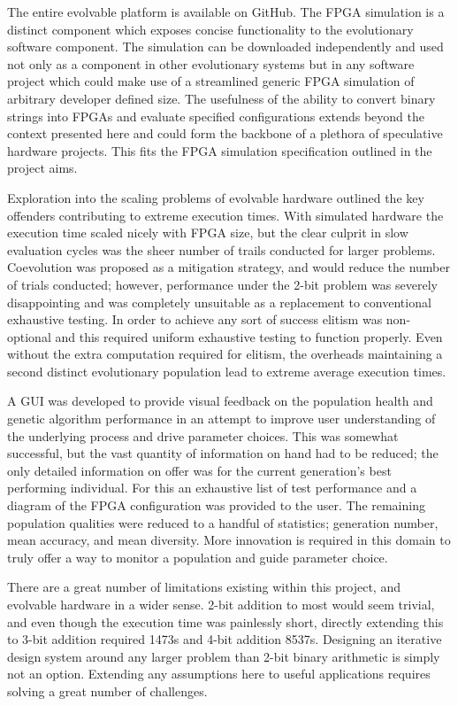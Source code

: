 The entire evolvable platform is available on GitHub. The FPGA simulation
is a distinct component which exposes concise functionality to the evolutionary
software component. The simulation can be downloaded independently and used
not only as a component in other evolutionary systems but in any software project
which could make use of a streamlined generic FPGA simulation of arbitrary developer
defined size. The usefulness of the ability to convert binary strings into FPGAs and evaluate specified
configurations extends beyond the context presented here and could form the backbone
of a plethora of speculative hardware projects. This fits the FPGA simulation
specification outlined in the project aims.

Exploration into the scaling problems of evolvable hardware outlined the key
offenders contributing to extreme execution times. With simulated hardware
the execution time scaled nicely with FPGA size, but the clear culprit in
slow evaluation cycles was the sheer number of trails conducted for larger
problems. Coevolution was proposed as a mitigation strategy, and would reduce
the number of trials conducted; however, performance under the 2-bit problem
was severely disappointing and was completely unsuitable as a replacement to
conventional exhaustive testing. In order to achieve any sort of success
elitism was non-optional and this required uniform exhaustive testing to function
properly. Even without the extra computation required for elitism, the overheads
maintaining a second distinct evolutionary population lead to extreme average
execution times.

A GUI was developed to provide visual feedback on the population health
and genetic algorithm performance in an attempt to improve user understanding
of the underlying process and drive parameter choices. This was somewhat successful,
but the vast quantity of information on hand had to be reduced; the only detailed
information on offer was for the current generation's best performing individual.
For this an exhaustive list of test performance and a diagram of the FPGA configuration
was provided to the user. The remaining population qualities were reduced to a handful
of statistics; generation number, mean accuracy, and mean diversity. More innovation
is required in this domain to truly offer a way to monitor a population and guide
parameter choice.

There are a great number of limitations existing within this project, and
evolvable hardware in a wider sense. 2-bit addition to most would seem trivial,
and even though the execution time was painlessly short, directly extending
this to 3-bit addition required 1473s and 4-bit addition 8537s. Designing an
iterative design system around any larger problem than 2-bit binary arithmetic
is simply not an option. Extending
any assumptions here to useful applications requires solving a great number of
challenges.

